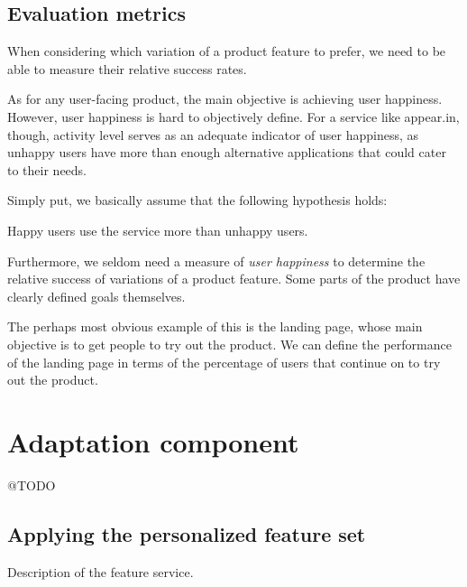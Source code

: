 \subsection{Evaluation metrics} %
\label{approach:sec:evaluation_metrics}

When considering which variation of a product feature to prefer, we need to be able to measure their relative success rates.

As for any user-facing product, the main objective is achieving user happiness. However, user happiness is hard to objectively define. For a service like appear.in, though, activity level serves as an adequate indicator of user happiness, as unhappy users have more than enough alternative applications that could cater to their needs.

Simply put, we basically assume that the following hypothesis holds:

\begin{hypothesis}
  Happy users use the service more than unhappy users.
\end{hypothesis}

Furthermore, we seldom need a measure of \emph{user happiness} to determine the relative success of variations of a product feature. Some parts of the product have clearly defined goals themselves.

The perhaps most obvious example of this is the landing page, whose main objective is to get people to try out the product. We can define the performance of the landing page in terms of the percentage of users that continue on to try out the product.

\section{Adaptation component} %
\label{approach:sec:adaptation_component}

@TODO

\subsection{Applying the personalized feature set} %
\label{approach:sec:applying_the_personalized_feature_set}

Description of the feature service.
